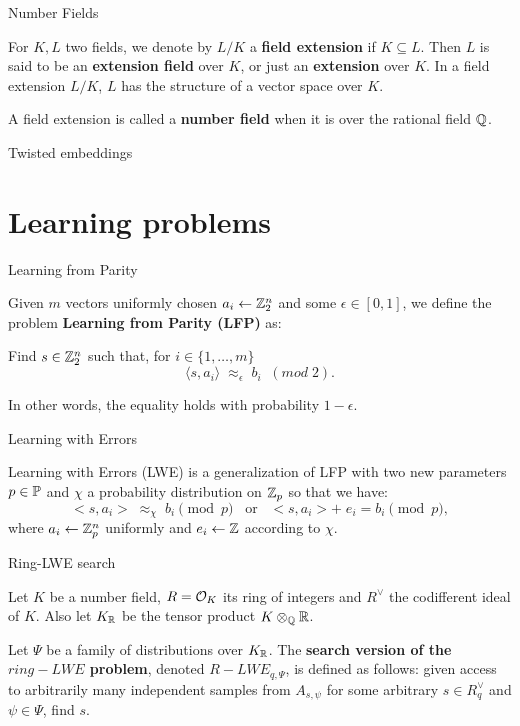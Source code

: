 \documentclass[notheorems, bigger]{beamer}
\begin{document}
\begin{frame}[label={sec:org152d71d}]{Number Fields}
\begin{text}
  For $K, L$ two fields, we denote by $L/K$ a \textbf{field extension} if  $K \subseteq
  L$. Then $L$ is said to be an \textbf{ extension field} over $K$, or just an
  \textbf{extension} over $K$. In a field extension $L/K$, $L$ has the structure of a vector space over $K$.


  A field extension is called a  \textbf{number field} when it is over the rational field $\Q$. 
\end{text}
\end{frame}
\begin{frame}[label={sec:orgf841564}]{Twisted embeddings}
\end{frame}

\section{Learning problems}
\label{sec:org1c8a19e}
\begin{frame}[label={sec:orgec4a900}]{Learning from Parity}
\begin{text}
  Given $m$ vectors uniformly chosen  $a_i \gets \Z^n_2$ and some $\epsilon \in [0,1]$, we
  define the problem \textbf{Learning from Parity (LFP)} as:

  Find $s \in \Z^n_2$ such that, for $i \in \{1,\dots,m\}$
  $$ \langle{s, a_i}\rangle \; \approx_\epsilon \; b_i \;\; (mod\; 2). $$

  In other words, the equality holds with probability $1 - \epsilon$.
\end{text}
\end{frame}
\begin{frame}[label={sec:orgf8a61ec}]{Learning with Errors}
\begin{text}
Learning with Errors (LWE) is a generalization of LFP  with two new parameters
$p \in \P$ and $\chi$ a probability distribution on $\Z_p$ so that we have:
\[
  <s, a_i> \; \approx_\chi \; b_i \pmod p \;\;\; \text{or} \;\;\; <s, a_i> + \; e_i =  b_i \pmod p ,
\]
where $a_i \gets \Z^n_p$ uniformly and $e_i \gets \Z$ according to $\chi$.
\end{text}
\end{frame}
\begin{frame}[label={sec:org10b0a11}]{Ring-LWE search}
\begin{text}
  Let $K$ be a number field, $R = \Ok$ its ring of integers and $R^\vee$ the
  codifferent ideal of $K$. Also let $K_\R$ be the tensor product $K \otimes_\Q \R$.


  Let $\Psi$ be a family of distributions over $K_\R$. The \textbf{search version of the $ring-LWE$ problem}, denoted $R-LWE_{q,\Psi}$, is defined as follows: given access to arbitrarily many independent samples from $A_{s,\psi}$ for some arbitrary $s \in R_q^\vee$ and $\psi \in \Psi$, find $s$.
\end{text}
\end{frame}
\end{document}
